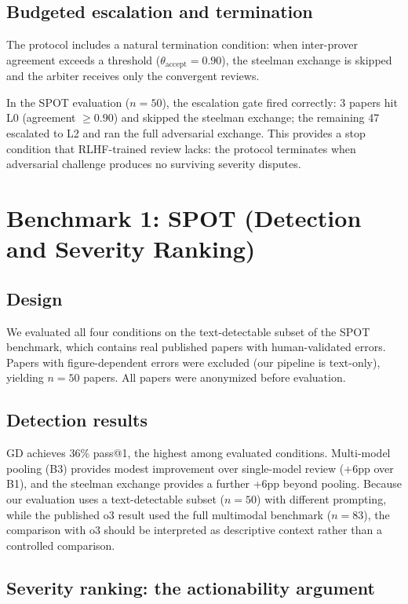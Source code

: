 \documentclass{ws-ijprai}
\begin{document}
\subsection{Budgeted escalation and termination}

The protocol includes a natural termination condition: when inter-prover
agreement exceeds a threshold ($\theta_{\text{accept}} = 0.90$), the steelman
exchange is skipped and the arbiter receives only the convergent reviews.

In the SPOT evaluation ($n=50$), the escalation gate fired correctly: 3 papers
hit L0 (agreement $\geq 0.90$) and skipped the steelman exchange; the
remaining 47 escalated to L2 and ran the full adversarial exchange. This
provides a stop condition that RLHF-trained review lacks: the protocol
terminates when adversarial challenge produces no surviving severity disputes.


\section{Benchmark 1: SPOT (Detection and Severity Ranking)}
\label{sec:spot_results}

\subsection{Design}

We evaluated all four conditions on the text-detectable subset of the SPOT
benchmark,\cite{son2025spot} which contains real published papers with
human-validated errors. Papers with figure-dependent errors were excluded (our
pipeline is text-only), yielding $n=50$ papers. All papers were anonymized
before evaluation.

\subsection{Detection results}

GD achieves 36\% pass@1, the highest among evaluated conditions. Multi-model
pooling (B3) provides modest improvement over single-model review (+6pp over
B1), and the steelman exchange provides a further +6pp beyond pooling.
Because our evaluation uses a text-detectable subset ($n=50$) with different
prompting, while the published o3 result used the full multimodal benchmark
($n=83$), the comparison with o3 should be interpreted as descriptive context
rather than a controlled comparison.

\subsection{Severity ranking: the actionability argument}
\end{document}
